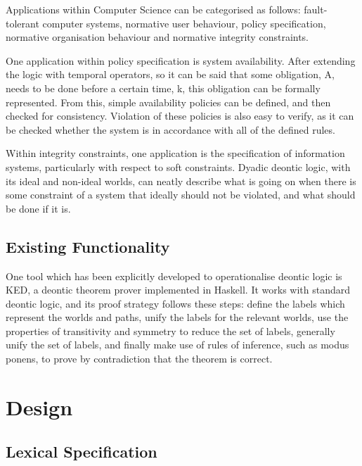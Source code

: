\documentclass{l4proj}
\begin{document}
Applications within Computer Science can be categorised as follows\cite{meyer93applications}: fault-tolerant computer systems, normative user behaviour, policy specification, normative organisation behaviour and normative integrity constraints. %

One application within policy specification is system availability\cite{brunel04deontic}. After extending the logic with temporal operators, so it can be said that some obligation, A, needs to be done before a certain time, k, this obligation can be formally represented. From this, simple availability policies can be defined, and then checked for consistency. Violation of these policies is also easy to verify, as it can be checked whether the system is in accordance with all of the defined rules. 

Within integrity constraints, one application is the specification of information systems\cite{infosystems}, particularly with respect to soft constraints. Dyadic deontic logic, with its ideal and non-ideal worlds, can neatly describe what is going on when there is some constraint of a system that ideally should not be violated, and what should be done if it is. 

\section{Existing Functionality}
One tool which has been explicitly developed to operationalise deontic logic is KED\cite{KED}, a deontic theorem prover implemented in Haskell. It works with standard deontic logic, and its proof strategy follows these steps: define the labels which represent the worlds and paths, unify the labels for the relevant worlds, use the properties of transitivity and symmetry to reduce the set of labels, generally unify the set of labels, and finally make use of rules of inference, such as modus ponens, to prove by contradiction that the theorem is correct. 


\chapter{Design}

\section{Lexical Specification}
\end{document}
